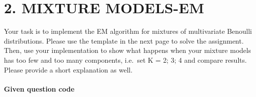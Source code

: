 \documentclass[]{article}
\let\oldparagraph\paragraph
\renewcommand{\paragraph}[1]{\oldparagraph{#1}\mbox{}}
\begin{document}
\section{2. MIXTURE MODELS-EM}\label{mixture-models-em}

Your task is to implement the EM algorithm for mixtures of multivariate
Benoulli distributions. Please use the template in the next page to
solve the assignment. Then, use your implementation to show what happens
when your mixture models has too few and too many components, i.e.~set K
= 2; 3; 4 and compare results. Please provide a short explanation as
well.

\paragraph{Given question code}\label{given-question-code}
\end{document}
